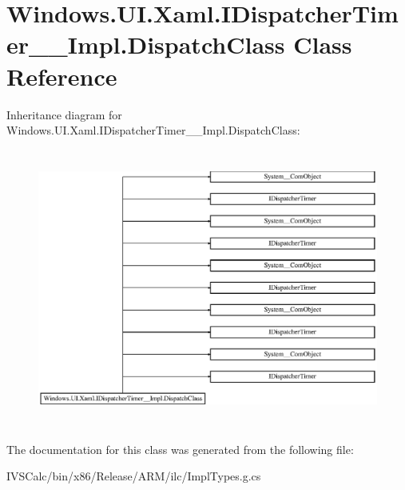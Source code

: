 \hypertarget{class_windows_1_1_u_i_1_1_xaml_1_1_i_dispatcher_timer_____impl_1_1_dispatch_class}{}\section{Windows.\+U\+I.\+Xaml.\+I\+Dispatcher\+Timer\+\_\+\+\_\+\+Impl.\+Dispatch\+Class Class Reference}
\label{class_windows_1_1_u_i_1_1_xaml_1_1_i_dispatcher_timer_____impl_1_1_dispatch_class}
Inheritance diagram for Windows.\+U\+I.\+Xaml.\+I\+Dispatcher\+Timer\+\_\+\+\_\+\+Impl.\+Dispatch\+Class\+:\begin{figure}[H]
\begin{center}
\leavevmode
\includegraphics[height=9.166667cm]{class_windows_1_1_u_i_1_1_xaml_1_1_i_dispatcher_timer_____impl_1_1_dispatch_class}
\end{center}
\end{figure}


The documentation for this class was generated from the following file\+:\begin{DoxyCompactItemize}
\item 
I\+V\+S\+Calc/bin/x86/\+Release/\+A\+R\+M/ilc/Impl\+Types.\+g.\+cs\end{DoxyCompactItemize}
